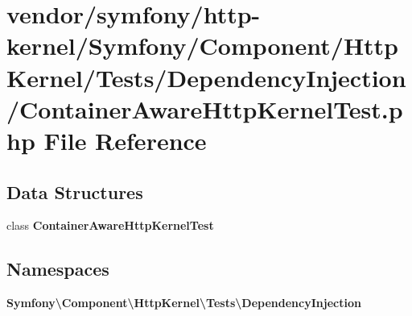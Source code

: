 \section{vendor/symfony/http-\/kernel/\+Symfony/\+Component/\+Http\+Kernel/\+Tests/\+Dependency\+Injection/\+Container\+Aware\+Http\+Kernel\+Test.php File Reference}
\label{_container_aware_http_kernel_test_8php}
\subsection*{Data Structures}
\begin{DoxyCompactItemize}
\item 
class {\bf Container\+Aware\+Http\+Kernel\+Test}
\end{DoxyCompactItemize}
\subsection*{Namespaces}
\begin{DoxyCompactItemize}
\item 
 {\bf Symfony\textbackslash{}\+Component\textbackslash{}\+Http\+Kernel\textbackslash{}\+Tests\textbackslash{}\+Dependency\+Injection}
\end{DoxyCompactItemize}
